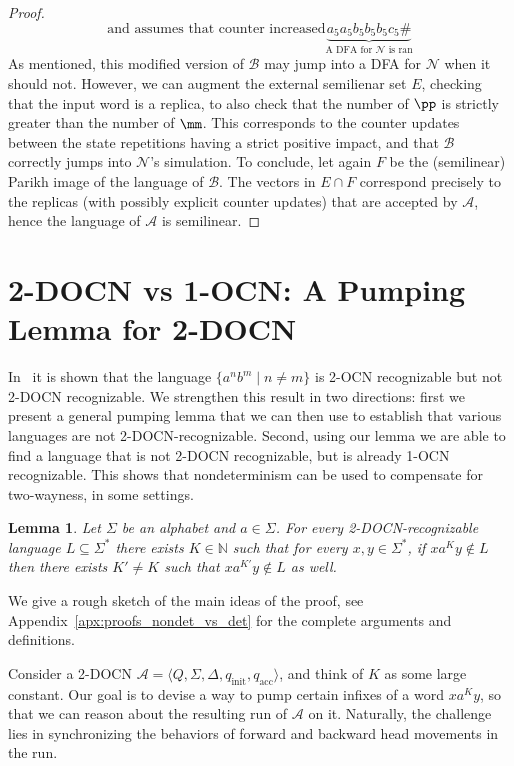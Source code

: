 \documentclass[11pt,a4paper]{amsart}
\newtheorem{lemma}[theorem]{Lemma}
\theoremstyle{definition}
\newcommand{\tup}[1]{\langle #1 \rangle}
\newcommand{\initstate}{q_{\mathrm{init}}}
\newcommand{\accstate}{q_{\mathrm{acc}}}
\newcommand{\bbN}{\mathbb{N}}
\newcommand{\cA}{\mathcal{A}}
\newcommand{\cB}{\mathcal{B}}
\newcommand{\cN}{\mathcal{N}}
\begin{document}
\begin{proof}
\[{		\text{and assumes that counter increased}}
	\underbrace{a_5a_5b_5b_5b_5c_5 \#}_{\text{A DFA for $\cN$ is ran}}\]
	As mentioned, this modified version of \(\cB\) may jump into a DFA for \(\cN\)
	when it should not.  However, we can augment the external semilienar set \(E\), checking that the input word is a replica, to also check that %
	the number of \(\pp\) is strictly greater than the number of \(\mm\).  This
	corresponds to the counter updates between the state repetitions having a
	strict positive impact, and that \(\cB\) correctly jumps into \(\cN\)'s
	simulation.  
	To conclude, let again \(F\) be the (semilinear) Parikh image of
	the language of \(\cB\).  The vectors in \(E \cap F\) correspond precisely to the
	replicas (with possibly explicit counter updates) that are accepted by \(\cA\),
	hence the language of \(\cA\) is semilinear.
\end{proof}

\section{2-DOCN  vs 1-OCN: A Pumping Lemma for  2-DOCN}
\label{sec:nondet_vs_det}
In~\cite{chan1987two} it is shown that the language $\{a^nb^m\mid n\neq m\}$ is 2-OCN
recognizable but not 2-DOCN recognizable. We strengthen this result in two
directions: first we present a general pumping lemma that we can then use to
establish that various languages are not 2-DOCN-recognizable. Second, using our
lemma we are able to find a language that is not 2-DOCN recognizable, but is
already 1-OCN recognizable. This shows that nondeterminism can be used to
compensate for two-wayness, in some settings.

\begin{lemma}\label{lem:2DOCN_pump}
	Let $\Sigma$ be an alphabet and $a\in \Sigma$. For every 2-DOCN-recognizable language
	\(L\subseteq \Sigma^*\) there exists \(K \in \bbN\) such that for every $x,y\in \Sigma^*$, if \(xa^Ky \notin
	L\) then there exists $K'\neq K$ such that \(xa^{K'}y \notin L\) as well.
\end{lemma} 
We give a rough sketch of the main ideas of the proof, see Appendix~\ref{apx:proofs_nondet_vs_det} for the complete arguments and definitions.

%
Consider a 2-DOCN $\cA=\tup{Q,\Sigma,\Delta,\initstate,\accstate}$, and think of $K$ as some large constant.
Our goal is to devise a way to pump certain infixes of a word $xa^Ky$, so that we can reason about the resulting run of $\cA$ on it. 
Naturally, the challenge lies in synchronizing the behaviors of forward and backward head movements in the run.
\end{document}
